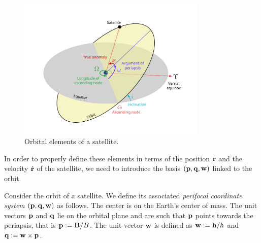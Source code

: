 \documentclass[../main.tex]{subfiles}
\begin{document}
\begin{figure}[ht]
  \centering
  \includegraphics[width=0.8\textwidth]{Images/orbital_elements.pdf}
  \caption{Orbital elements of a satellite.}
  \label{fig:orbital_elements}
\end{figure}
In order to properly define these elements in terms of the position $\boldsymbol{\mathrm{r}}$ and the velocity $\dot{\boldsymbol{\mathrm{r}}}$ of the satellite, we need to introduce the basis $(\boldsymbol{\mathrm{p}}, \boldsymbol{\mathrm{q}}, \boldsymbol{\mathrm{w}})$ linked to the orbit.
\begin{definition}
  Consider the orbit of a satellite. We define its associated \emph{perifocal coordinate system} $(\boldsymbol{\mathrm{p}}, \boldsymbol{\mathrm{q}}, \boldsymbol{\mathrm{w}})$ as follows. The center is on the Earth's center of mass. The unit vectors $\boldsymbol{\mathrm{p}}$ and $\boldsymbol{\mathrm{q}}$ lie on the orbital plane and are such that $\boldsymbol{\mathrm{p}}$ points towards the periapsis, that is $\boldsymbol{\mathrm{p}}:=\boldsymbol{\mathrm{B}}/B$. The unit vector $\boldsymbol{\mathrm{w}}$ is defined as $\boldsymbol{\mathrm{w}}:=\boldsymbol{\mathrm{h}}/h$ and $\boldsymbol{\mathrm{q}}:=\boldsymbol{\mathrm{w}}\times\boldsymbol{\mathrm{p}}$.
\end{definition}
\end{document}

